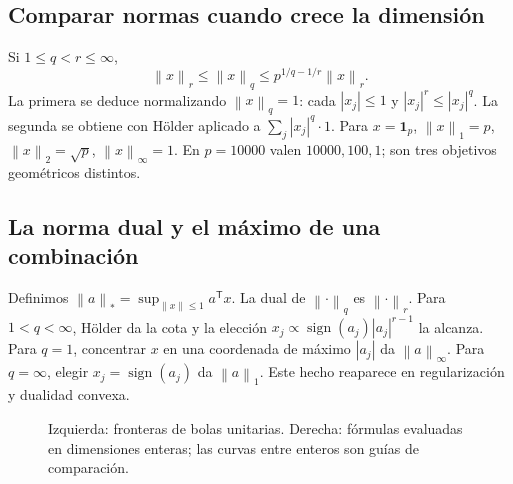 \documentclass[11pt,a4paper]{article}
\newcommand{\T}{^{\mathsf T}}
\newcommand{\norm}[1]{\left\lVert #1\right\rVert}
\DeclareMathOperator{\sign}{sign}
\newcommand{\ones}{\mathbf 1}
\theoremstyle{definition}
\begin{document}
\subsection{Comparar normas cuando crece la dimensión}
Si $1\le q<r\le\infty$,
\[
\norm x_r\le\norm x_q\le p^{1/q-1/r}\norm x_r.
\]
La primera se deduce normalizando $\norm x_q=1$: cada $|x_j|\le1$ y $|x_j|^r\le|x_j|^q$. La segunda se obtiene con Hölder aplicado a $\sum_j|x_j|^q\cdot1$. Para $x=\ones_p$, $\norm x_1=p$, $\norm x_2=\sqrt p$, $\norm x_\infty=1$. En $p=10000$ valen $10000,100,1$; son tres objetivos geométricos distintos.
\subsection{La norma dual y el máximo de una combinación}
Definimos $\norm a_* =\sup_{\norm x\le1}a\T x$. La dual de $\norm\cdot_q$ es $\norm\cdot_r$. Para $1<q<\infty$, Hölder da la cota y la elección $x_j\propto\sign(a_j)|a_j|^{r-1}$ la alcanza. Para $q=1$, concentrar $x$ en una coordenada de máximo $|a_j|$ da $\norm a_\infty$. Para $q=\infty$, elegir $x_j=\sign(a_j)$ da $\norm a_1$. Este hecho reaparece en regularización y dualidad convexa.
\begin{figure}[H]\centering
{}\hfill
{}
\caption{Izquierda: fronteras de bolas unitarias. Derecha: fórmulas evaluadas en dimensiones enteras; las curvas entre enteros son guías de comparación.}
\end{figure}
\end{document}
